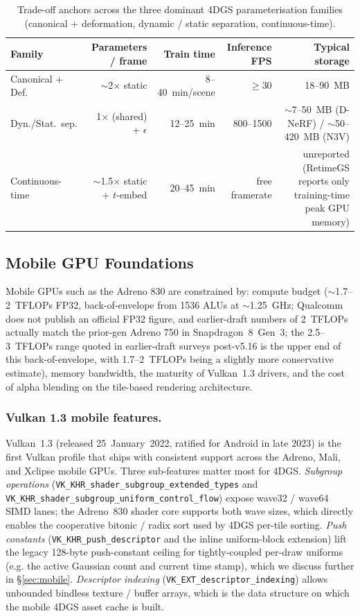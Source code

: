 \begin{table}[t]
  \centering
\caption{Trade-off anchors across the three dominant 4DGS
parameterisation families (canonical + deformation, dynamic /
static separation, continuous-time).}
\label{tab:bg-tradeoffs}
\footnotesize
\setlength{\tabcolsep}{4pt}
\begin{tabular}{lrrrr}
\toprule
\textbf{Family} & \textbf{Parameters / frame} &
\textbf{Train time} & \textbf{Inference FPS} &
\textbf{Typical storage} \\
\midrule
Canonical + Def. & $\sim$2$\times$ static & 8--40~min/scene & $\geq$30 & 18--90~MB \\
Dyn./Stat.\ sep. & 1$\times$ (shared) + $\epsilon$ & 12--25~min & 800--1500 & $\sim$7--50~MB (D-NeRF) / $\sim$50--420~MB (N3V) \\
Continuous-time & $\sim$1.5$\times$ static + $t$-embed & 20--45~min & free framerate & unreported (RetimeGS reports only training-time peak GPU memory) \\
\bottomrule
  \end{tabular}
\end{table}

\subsection{Mobile GPU Foundations}
Mobile GPUs such as the Adreno 830 are constrained by: compute
budget ($\sim$1.7--2~TFLOPs FP32, back-of-envelope from 1536 ALUs
at $\sim$1.25~GHz; Qualcomm does not publish an official FP32
figure, and earlier-draft numbers of 2~TFLOPs actually match the
prior-gen Adreno 750 in Snapdragon~8~Gen~3; the 2.5--3~TFLOPs
range quoted in earlier-draft surveys post-v5.16 is the upper
end of this back-of-envelope, with 1.7--2~TFLOPs being a
slightly more conservative estimate), memory bandwidth,
the maturity of Vulkan~1.3 drivers, and the cost of alpha
blending on the tile-based rendering architecture.

\subsubsection{Vulkan 1.3 mobile features.}
Vulkan~1.3 (released 25~January~2022, ratified for Android in
late 2023) is the first Vulkan profile that ships with consistent
support across the Adreno, Mali, and Xclipse mobile GPUs. Three
sub-features matter most for 4DGS. \emph{Subgroup operations}
(\texttt{VK\_KHR\_shader\_subgroup\_extended\_types} and
\texttt{VK\_KHR\_shader\_subgroup\_uniform\_control\_flow}) expose
wave32 / wave64 SIMD lanes; the Adreno~830 shader core supports
both wave sizes, which directly enables the cooperative
bitonic / radix sort used by 4DGS per-tile sorting. \emph{Push
constants} (\texttt{VK\_KHR\_push\_descriptor} and the inline
uniform-block extension) lift the legacy 128-byte push-constant
ceiling for tightly-coupled per-draw uniforms (e.g. the active
Gaussian count and current time stamp), which we discuss further
in \S\ref{sec:mobile}. \emph{Descriptor indexing}
(\texttt{VK\_EXT\_descriptor\_indexing}) allows unbounded bindless
texture / buffer arrays, which is the data structure on which the
mobile 4DGS asset cache is built.


